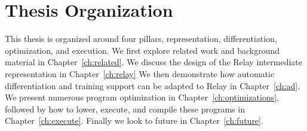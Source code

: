 \section{Thesis Organization}

This thesis is organized around four pillars, representation, differentiation, optimization, and execution.
We first explore related work and background material in Chapter~\ref{ch:related}.
We discuss the design of the Relay intermediate representation in Chapter~\ref{ch:relay}
We then demonstrate how automatic differentiation and training support can be adapted to Relay in Chapter~\ref{ch:ad}.
We present numerous program optimization in Chapter~\ref{ch:optimizations},
  followed by how to lower, execute, and compile these programs in
  Chapter~\ref{ch:execute}.
Finally we look to future in Chapter~\ref{ch:future}.
